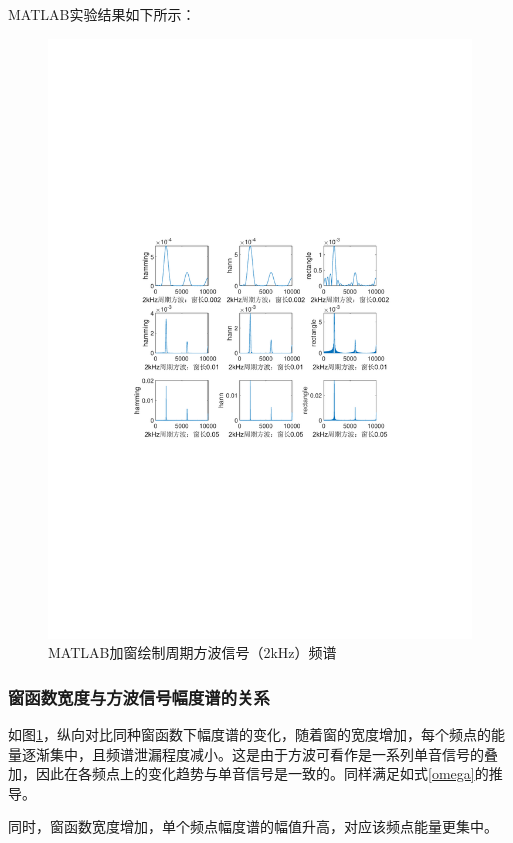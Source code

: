 \documentclass[12pt]{article}
\begin{document}
MATLAB实验结果如下所示：
\begin{figure}[H]
    \centering
    \includegraphics[scale=1]{matlab_squ.pdf}
    \caption{MATLAB加窗绘制周期方波信号（2kHz）频谱}
    \label{matlab_square}
\end{figure}

\subsubsection{窗函数宽度与方波信号幅度谱的关系}
如图\ref{matlab_square}，纵向对比同种窗函数下幅度谱的变化，随着窗的宽度增加，每个频点的能量逐渐集中，且频谱泄漏程度减小。这是由于方波可看作是一系列单音信号的叠加，因此在各频点上的变化趋势与单音信号是一致的。同样满足如式\ref{omega}的推导。

同时，窗函数宽度增加，单个频点幅度谱的幅值升高，对应该频点能量更集中。
\end{document}
